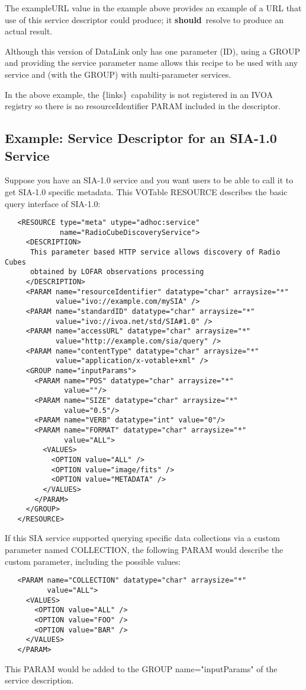 \documentclass[11pt,a4paper]{ivoa}
\newcommand{\blinks}{\{links\}}
\newcommand{\attval}[2]{#1={\allowbreak}{"}#2{"}}
\newcommand{\rfcshould}{\textbf{should}}
\begin{document}
The exampleURL value in the example above provides an example
of a URL that use of this service descriptor could produce;
it \rfcshould\ resolve to produce an actual result.
 
Although this version of DataLink only has one parameter (ID), using a
GROUP and providing the service parameter name allows this recipe to be
used with any service and (with the GROUP) with multi-parameter services.

In the above example, the \blinks\ capability is not registered in an
IVOA registry so there is no resourceIdentifier PARAM included in the
descriptor.


\subsection{Example: Service Descriptor for an SIA-1.0 Service}

Suppose you have an SIA-1.0 service and you want users to be able to
call it to get SIA-1.0 specific metadata. This VOTable RESOURCE describes
the basic query interface of SIA-1.0:
\begin{verbatim}
   <RESOURCE type="meta" utype="adhoc:service" 
             name="RadioCubeDiscoveryService">
     <DESCRIPTION> 
      This parameter based HTTP service allows discovery of Radio Cubes 
      obtained by LOFAR observations processing 
     </DESCRIPTION>
     <PARAM name="resourceIdentifier" datatype="char" arraysize="*"
            value="ivo://example.com/mySIA" />
     <PARAM name="standardID" datatype="char" arraysize="*"
            value="ivo://ivoa.net/std/SIA#1.0" />
     <PARAM name="accessURL" datatype="char" arraysize="*"
            value="http://example.com/sia/query" />
     <PARAM name="contentType" datatype="char" arraysize="*" 
            value="application/x-votable+xml" />
     <GROUP name="inputParams">
       <PARAM name="POS" datatype="char" arraysize="*"
              value=""/>
       <PARAM name="SIZE" datatype="char" arraysize="*"
              value="0.5"/>
       <PARAM name="VERB" datatype="int" value="0"/>
       <PARAM name="FORMAT" datatype="char" arraysize="*"
              value="ALL">
         <VALUES>
           <OPTION value="ALL" />
           <OPTION value="image/fits" />
           <OPTION value="METADATA" />
         </VALUES>
       </PARAM>
     </GROUP>
   </RESOURCE>
\end{verbatim}

If this SIA service supported querying specific data collections via
a custom parameter named COLLECTION, the following PARAM would describe the
custom parameter, including the possible values:
\begin{verbatim}
   <PARAM name="COLLECTION" datatype="char" arraysize="*"
          value="ALL">
     <VALUES>
       <OPTION value="ALL" />
       <OPTION value="FOO" />
       <OPTION value="BAR" />
     </VALUES>
   </PARAM>
\end{verbatim}
This PARAM would be added to the GROUP \attval{name}{inputParams}
of the service description.
\end{document}
